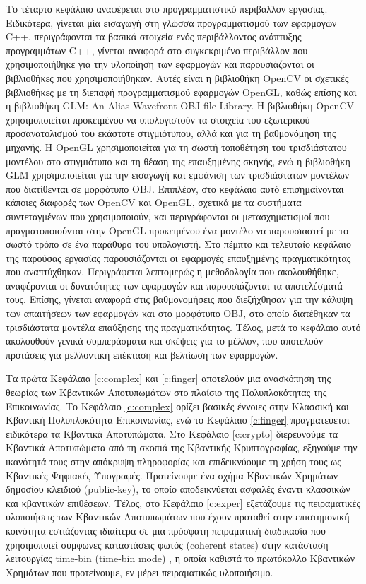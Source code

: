 Το τέταρτο κεφάλαιο αναφέρεται στο προγραμματιστικό περιβάλλον εργασίας. Ειδικότερα, γίνεται μία εισαγωγή στη γλώσσα προγραμματισμού των εφαρμογών C++, περιγράφονται τα βασικά στοιχεία ενός περιβάλλοντος ανάπτυξης προγραμμάτων C++, γίνεται αναφορά στο συγκεκριμένο περιβάλλον που χρησιμοποιήθηκε για την υλοποίηση των εφαρμογών και παρουσιάζονται οι βιβλιοθήκες που χρησιμοποιήθηκαν. Αυτές είναι η βιβλιοθήκη OpenCV οι σχετικές βιβλιοθήκες με τη διεπαφή προγραμματισμού εφαρμογών OpenGL, καθώς επίσης και η βιβλιοθήκη GLM: An Alias Wavefront OBJ file Library. Η βιβλιοθήκη OpenCV χρησιμοποιείται προκειμένου να υπολογιστούν τα στοιχεία του εξωτερικού προσανατολισμού του εκάστοτε στιγμιότυπου, αλλά και για τη βαθμονόμηση της μηχανής. Η ΟpenGL χρησιμοποιείται για τη σωστή τοποθέτηση του τρισδιάστατου μοντέλου στο στιγμιότυπο και τη θέαση της επαυξημένης σκηνής, ενώ η βιβλιοθήκη GLM χρησιμοποιείται για την εισαγωγή και εμφάνιση των τρισδιάστατων μοντέλων που διατίθενται σε μορφότυπο OBJ. Επιπλέον, στο κεφάλαιο αυτό επισημαίνονται κάποιες διαφορές των OpenCV και OpenGL, σχετικά με τα συστήματα συντεταγμένων που χρησιμοποιούν, και περιγράφονται οι μετασχηματισμοί που πραγματοποιούνται στην OpenGL προκειμένου ένα μοντέλο να παρουσιαστεί με το σωστό τρόπο σε ένα παράθυρο του υπολογιστή. Στο πέμπτο και τελευταίο κεφάλαιο της παρούσας εργασίας παρουσιάζονται οι εφαρμογές επαυξημένης πραγματικότητας που αναπτύχθηκαν. Περιγράφεται λεπτομερώς η μεθοδολογία που ακολουθήθηκε, αναφέρονται οι δυνατότητες των εφαρμογών και παρουσιάζονται τα αποτελέσματά τους. Επίσης, γίνεται αναφορά στις βαθμονομήσεις που διεξήχθησαν για την κάλυψη των απαιτήσεων των εφαρμογών και στο μορφότυπο OBJ, στο οποίο διατέθηκαν τα τρισδιάστατα μοντέλα επαύξησης της πραγματικότητας. Τέλος, μετά το κεφάλαιο αυτό ακολουθούν γενικά συμπεράσματα και σκέψεις για το μέλλον, που αποτελούν προτάσεις για μελλοντική επέκταση και βελτίωση των εφαρμογών.


Τα πρώτα Κεφάλαια \ref{c:complex} και \ref{c:finger} αποτελούν μια ανασκόπηση της θεωρίας των Κβαντικών Αποτυπωμάτων στο πλαίσιο της Πολυπλοκότητας της Επικοινωνίας. Το Κεφάλαιο \ref{c:complex} ορίζει βασικές έννοιες στην Κλασσική και Κβαντική Πολυπλοκότητα Επικοινωνίας, ενώ το Κεφάλαιο \ref{c:finger} πραγματεύεται ειδικότερα τα Κβαντικά Αποτυπώματα. Στο Κεφάλαιο \ref{c:crypto} διερευνούμε τα Κβαντικά Αποτυπώματα από τη σκοπιά της Κβαντικής Κρυπτογραφίας, εξηγούμε την ικανότητά τους στην απόκρυψη πληροφορίας και επιδεικνύουμε  τη χρήση τους ως Κβαντικές Ψηφιακές Υπογραφές. Προτείνουμε ένα σχήμα Κβαντικών Χρημάτων δημοσίου κλειδιού (public-key), το οποίο αποδεικνύεται ασφαλές έναντι κλασσικών και κβαντικών επιθέσεων. Τέλος, στο Κεφάλαιο \ref{c:exper} εξετάζουμε τις πειραματικές υλοποιήσεις των Κβαντικών Αποτυπωμάτων που έχουν προταθεί στην επιστημονική κοινότητα εστιάζοντας ιδιαίτερα σε μια πρόσφατη πειραματική διαδικασία που χρησιμοποιεί σύμφωνες καταστάσεις φωτός (coherent states) στην κατάσταση λειτουργίας time-bin (time-bin mode) \cite{constant}, η οποία καθιστά το πρωτόκολλο Κβαντικών Χρημάτων που προτείνουμε, εν μέρει πειραματικώς υλοποιήσιμο.

